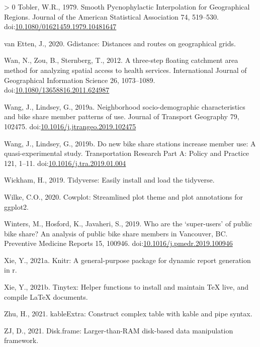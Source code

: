 \documentclass[]{elsarticle} %
\newlength{\cslhangindent}
\newenvironment{CSLReferences}[3] %
 {%
  \setlength{\parindent}{0pt}
  \ifodd #1 \everypar{\setlength{\hangindent}{\cslhangindent}}\ignorespaces\fi
  \ifnum #2 > 0
  \setlength{\parskip}{#2\baselineskip}
  \fi
 }%
 {}
\begin{document}
\begin{CSLReferences}{1}{0}
\leavevmode\hypertarget{ref-toblerSmoothPycnophylacticInterpolation1979}{}%
Tobler, W.R., 1979. Smooth {Pycnophylactic Interpolation} for
{Geographical Regions}. Journal of the American Statistical Association
74, 519--530.
doi:\href{https://doi.org/10.1080/01621459.1979.10481647}{10.1080/01621459.1979.10481647}

\leavevmode\hypertarget{ref-R-gdistance}{}%
van Etten, J., 2020. Gdistance: Distances and routes on geographical
grids.

\leavevmode\hypertarget{ref-wanThreestepFloatingCatchment2012}{}%
Wan, N., Zou, B., Sternberg, T., 2012. A three-step floating catchment
area method for analyzing spatial access to health services.
International Journal of Geographical Information Science 26,
1073--1089.
doi:\href{https://doi.org/10.1080/13658816.2011.624987}{10.1080/13658816.2011.624987}

\leavevmode\hypertarget{ref-wangNeighborhoodSociodemographicCharacteristics2019}{}%
Wang, J., Lindsey, G., 2019a. Neighborhood socio-demographic
characteristics and bike share member patterns of use. Journal of
Transport Geography 79, 102475.
doi:\href{https://doi.org/10.1016/j.jtrangeo.2019.102475}{10.1016/j.jtrangeo.2019.102475}

\leavevmode\hypertarget{ref-wangNewBikeShare2019}{}%
Wang, J., Lindsey, G., 2019b. Do new bike share stations increase member
use: {A} quasi-experimental study. Transportation Research Part A:
Policy and Practice 121, 1--11.
doi:\href{https://doi.org/10.1016/j.tra.2019.01.004}{10.1016/j.tra.2019.01.004}

\leavevmode\hypertarget{ref-R-tidyverse}{}%
Wickham, H., 2019. Tidyverse: Easily install and load the tidyverse.

\leavevmode\hypertarget{ref-R-cowplot}{}%
Wilke, C.O., 2020. Cowplot: Streamlined plot theme and plot annotations
for ggplot2.

\leavevmode\hypertarget{ref-wintersWhoAreSuperusers2019}{}%
Winters, M., Hosford, K., Javaheri, S., 2019. Who are the
{`super-users'} of public bike share? {An} analysis of public bike share
members in {Vancouver}, {BC}. Preventive Medicine Reports 15, 100946.
doi:\href{https://doi.org/10.1016/j.pmedr.2019.100946}{10.1016/j.pmedr.2019.100946}

\leavevmode\hypertarget{ref-R-knitr}{}%
Xie, Y., 2021a. Knitr: A general-purpose package for dynamic report
generation in r.

\leavevmode\hypertarget{ref-R-tinytex}{}%
Xie, Y., 2021b. Tinytex: Helper functions to install and maintain TeX
live, and compile LaTeX documents.

\leavevmode\hypertarget{ref-R-kableExtra}{}%
Zhu, H., 2021. kableExtra: Construct complex table with kable and pipe
syntax.

\leavevmode\hypertarget{ref-R-disk.frame}{}%
ZJ, D., 2021. Disk.frame: Larger-than-RAM disk-based data manipulation
framework.

\end{CSLReferences}
\end{document}
